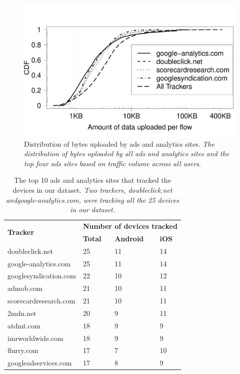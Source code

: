 \begin{figure}
\includegraphics[width=\columnwidth]{plots/distrib_ad_uploads.pdf}
\caption{Distribution of bytes uploaded by ads and analytics sites. \emph{The distribution of bytes uploaded by all ads and analytics sites and the top four ads sites based on traffic volume across all users}.}
\label{fig:description}
\end{figure}

\begin{table}
\begin{small}
\begin{tabular}{|p{}|p{}|p{}|p{}|}
\hline
\multirow{2}{*}{\bf Tracker} & \multicolumn{3}{c|}{\bf Number of devices tracked}\tabularnewline
\cline{2-4}
   &  {\bf Total} & {\bf Android} & {\bf iOS} \tabularnewline
\hline
doubleclick.net & 25 & 11 & 14 \tabularnewline
\hline
google-analytics.com   & 25 & 11 & 14 \tabularnewline
\hline
googlesyndication.com  & 22 & 10 & 12 \tabularnewline
\hline
admob.com  & 21 & 10 & 11 \tabularnewline
\hline
scorecardresearch.com &  21 & 10 & 11 \tabularnewline
\hline
2mdn.net  &  20 & 9 &  11 \tabularnewline
\hline
atdmt.com  & 18 & 9 &  9 \tabularnewline
\hline
imrworldwide.com & 18 &  9 &  9 \tabularnewline
\hline
flurry.com & 17 & 7 &  10 \tabularnewline
\hline
googleadservices.com  & 17 & 8 &  9 \tabularnewline
\hline
\end{tabular}
\end{small}
\caption{The top 10 ads and analytics sites that tracked the devices in our dataset.
\emph{Two trackers, \emph{doubleclick.net} and\emph{google-analytics.com}, were tracking all the 25 devices in our dataset.}}
\label{tab:top_trackers}
\end{table}


